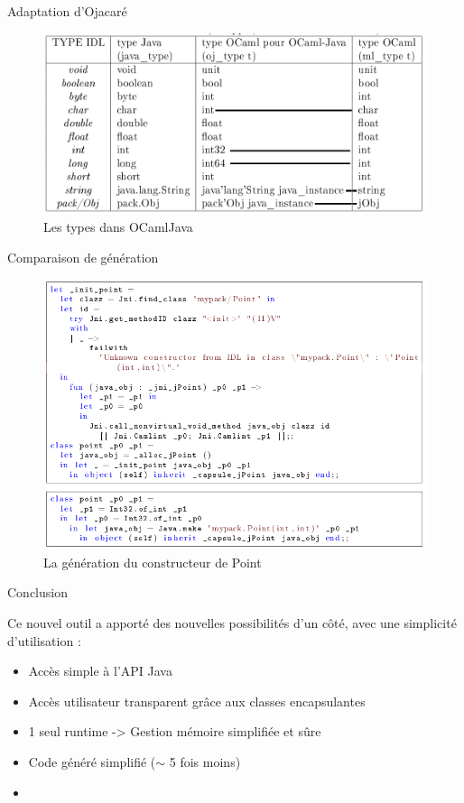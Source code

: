 \documentclass[xcolor={table,dvipsnames}]{beamer}
\begin{document}
\begin{frame}{Adaptation d'Ojacaré}

\begin{figure}[h]
  \centering
  \includegraphics[scale=0.30]{typesOCamlJava.png}
  \caption{Les types dans OCamlJava}
\end{figure}

\end{frame}

\begin{frame}{Comparaison de génération}
\begin{figure}[h]
  \centering
  \includegraphics[scale=0.35]{exemple.png}
  \caption{La génération du constructeur de Point}
\end{figure}
\end{frame}


\begin{frame}{Conclusion}

Ce nouvel outil a apporté des nouvelles possibilités d'un côté,
avec une simplicité d'utilisation :
\begin{itemize}
\item Accès simple à l'API Java
\item Accès utilisateur transparent grâce aux classes encapsulantes
\item 1 seul runtime -> Gestion mémoire simplifiée et sûre
\item Code généré simplifié ($\sim$ 5 fois moins)
\item 
\end{itemize}

\end{frame}
\end{document}
